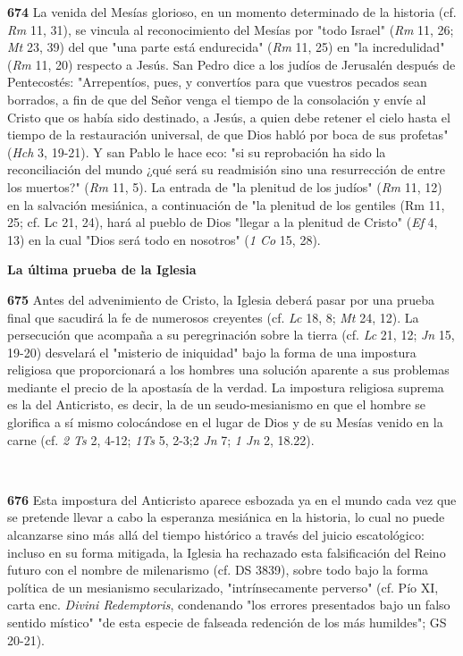 \textbf{674} La venida del Mesías glorioso, en un momento determinado de la historia (cf. \emph{Rm} 11, 31), se vincula al reconocimiento del Mesías por "todo Israel" (\emph{Rm} 11, 26; \emph{Mt} 23, 39) del que "una parte está endurecida" (\emph{Rm} 11, 25) en "la incredulidad" (\emph{Rm} 11, 20) respecto a Jesús. San Pedro dice a los judíos de Jerusalén después de Pentecostés: "Arrepentíos, pues, y convertíos para que vuestros pecados sean borrados, a fin de que del Señor venga el tiempo de la consolación y envíe al Cristo que os había sido destinado, a Jesús, a quien debe retener el cielo hasta el tiempo de la restauración universal, de que Dios habló por boca de sus profetas" (\emph{Hch} 3, 19-21). Y san Pablo le hace eco: "si su reprobación ha sido la reconciliación del mundo ¿qué será su readmisión sino una resurrección de entre los muertos?" (\emph{Rm} 11, 5). La entrada de "la plenitud de los judíos" (\emph{Rm} 11, 12) en la salvación mesiánica, a continuación de "la plenitud de los gentiles (Rm 11, 25; cf. Lc 21, 24), hará al pueblo de Dios "llegar a la plenitud de Cristo" (\emph{Ef} 4, 13) en la cual "Dios será todo en nosotros" (\emph{1 Co} 15, 28).

\textbf{La última prueba de la Iglesia}

\textbf{675} Antes del advenimiento de Cristo, la Iglesia deberá pasar por una prueba final que sacudirá la fe de numerosos creyentes (cf. \emph{Lc} 18, 8; \emph{Mt} 24, 12). La persecución que acompaña a su peregrinación sobre la tierra (cf. \emph{Lc} 21, 12; \emph{Jn} 15, 19-20) desvelará el "misterio de iniquidad" bajo la forma de una impostura religiosa que proporcionará a los hombres una solución aparente a sus problemas mediante el precio de la apostasía de la verdad. La impostura religiosa suprema es la del Anticristo, es decir, la de un seudo-mesianismo en que el hombre se glorifica a sí mismo colocándose en el lugar de Dios y de su Mesías venido en la carne (cf. \emph{2 Ts} 2, 4-12; \emph{1Ts} 5, 2-3;2 \emph{Jn} 7; \emph{1 Jn} 2, 18.22).

\textbf{\\ }

\textbf{676} Esta impostura del Anticristo aparece esbozada ya en el mundo cada vez que se pretende llevar a cabo la esperanza mesiánica en la historia, lo cual no puede alcanzarse sino más allá del tiempo histórico a través del juicio escatológico: incluso en su forma mitigada, la Iglesia ha rechazado esta falsificación del Reino futuro con el nombre de milenarismo (cf. DS 3839), sobre todo bajo la forma política de un mesianismo secularizado, "intrínsecamente perverso" (cf. Pío XI, carta enc. \emph{Divini Redemptoris}, condenando "los errores presentados bajo un falso sentido místico" "de esta especie de falseada redención de los más humildes"; GS 20-21).

